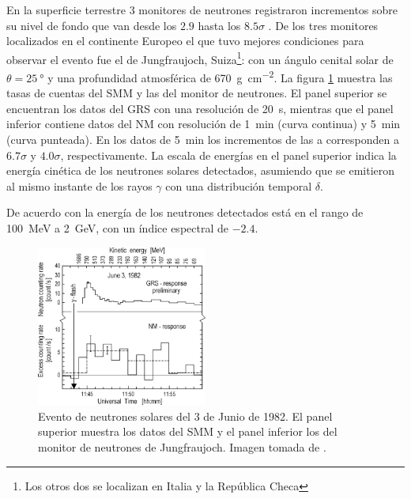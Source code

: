 En la superficie terrestre \num{3} monitores de neutrones registraron incrementos sobre su nivel de fondo que van desde los $2.9$ hasta los $8.5\sigma$ \cite{chupp87}. De los tres monitores localizados en el continente Europeo el que tuvo mejores condiciones para observar el evento fue el de Jungfraujoch, Suiza\footnote{Los otros dos se localizan en Italia y la República Checa}: con un ángulo cenital solar de $\theta=\SI{25}{\degree}$ y una profundidad atmosférica de \SI{670}{\gram\per\square\cm}. La figura \ref{fig:neutrons-ground} muestra las tasas de cuentas del SMM y las del monitor de neutrones. El panel superior se encuentran los datos del GRS con una resolución de \SI{20}{\second}, mientras que el panel inferior contiene datos del NM con resolución de \SI{1}{\minute} (curva continua) y \SI{5}{\minute} (curva punteada). En los datos de \SI{5}{\minute} los incrementos de las  a  corresponden a $6.7\sigma$ y $4.0\sigma$, respectivamente. La escala de energías en el panel superior indica la energía cinética de los neutrones solares detectados, asumiendo que se emitieron al mismo instante de los rayos $\gamma$ con una distribución temporal $\delta$.

De acuerdo con \cite{chupp87} la energía de los neutrones detectados está en el rango de \SI{100}{\mega\electronvolt} a \SI{2}{\giga\electronvolt}, con un índice espectral de $-2.4$.

\begin{figure}
        \centering
        \includegraphics[width=0.5\textwidth]{neutrons-ground.png}
        \caption{Evento de neutrones solares del \num{3} de Junio de \num{1982}. El panel superior muestra los datos del SMM y el panel inferior los del monitor de neutrones de Jungfraujoch. Imagen tomada de \cite{debrunner83}.}
        \label{fig:neutrons-ground}
\end{figure}

